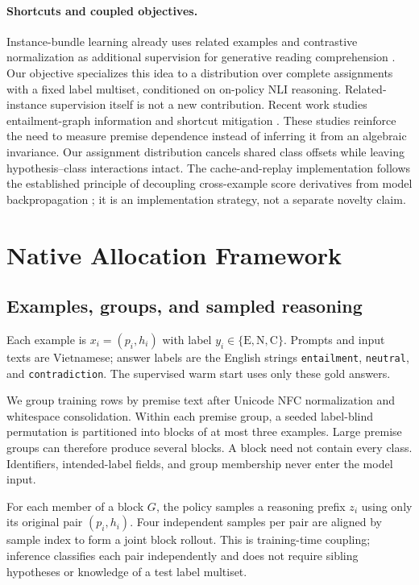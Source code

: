 \documentclass[11pt]{article}
\newcommand{\E}{\mathrm{E}}
\newcommand{\N}{\mathrm{N}}
\newcommand{\C}{\mathrm{C}}
\begin{document}
\paragraph{Shortcuts and coupled objectives.}
Instance-bundle learning already uses related examples and contrastive normalization as additional supervision for generative reading comprehension \citep{dua-etal-2021-learning}. Our objective specializes this idea to a distribution over complete assignments with a fixed label multiset, conditioned on on-policy NLI reasoning. Related-instance supervision itself is not a new contribution.
Recent work studies entailment-graph information and shortcut mitigation \citep{cheng-etal-2025-neutralizing,li-etal-2026-shortcuts}. These studies reinforce the need to measure premise dependence instead of inferring it from an algebraic invariance. Our assignment distribution cancels shared class offsets while leaving hypothesis--class interactions intact. The cache-and-replay implementation follows the established principle of decoupling cross-example score derivatives from model backpropagation \citep{gao-etal-2021-scaling}; it is an implementation strategy, not a separate novelty claim.

\section{Native Allocation Framework}
\subsection{Examples, groups, and sampled reasoning}
Each example is $x_i=(p_i,h_i)$ with label $y_i\in\{\E,\N,\C\}$. Prompts and input texts are Vietnamese; answer labels are the English strings \texttt{entailment}, \texttt{neutral}, and \texttt{contradiction}. The supervised warm start uses only these gold answers.

We group training rows by premise text after Unicode NFC normalization and whitespace consolidation. Within each premise group, a seeded label-blind permutation is partitioned into blocks of at most three examples. Large premise groups can therefore produce several blocks. A block need not contain every class. Identifiers, intended-label fields, and group membership never enter the model input.

For each member of a block $G$, the policy samples a reasoning prefix $z_i$ using only its original pair $(p_i,h_i)$. Four independent samples per pair are aligned by sample index to form a joint block rollout. This is training-time coupling; inference classifies each pair independently and does not require sibling hypotheses or knowledge of a test label multiset.
\end{document}
